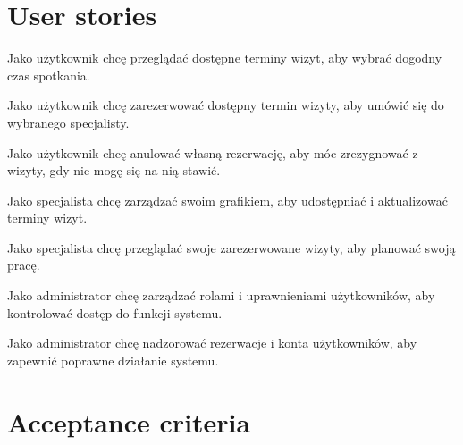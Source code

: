 \documentclass[12pt,a4paper]{article}
\begin{document}
\section{User stories}
\begin{description}[leftmargin=1.8cm, labelwidth=1.3cm, labelsep=0.5cm]
    \item[US1] Jako użytkownik chcę przeglądać dostępne terminy wizyt, aby wybrać dogodny czas spotkania.
    \item[US2] Jako użytkownik chcę zarezerwować dostępny termin wizyty, aby umówić się do wybranego specjalisty.
    \item[US3] Jako użytkownik chcę anulować własną rezerwację, aby móc zrezygnować z wizyty, gdy nie mogę się na nią stawić.
    \item[US4] Jako specjalista chcę zarządzać swoim grafikiem, aby udostępniać i aktualizować terminy wizyt.
    \item[US5] Jako specjalista chcę przeglądać swoje zarezerwowane wizyty, aby planować swoją pracę.
    \item[US6] Jako administrator chcę zarządzać rolami i uprawnieniami użytkowników, aby kontrolować dostęp do funkcji systemu.
    \item[US7] Jako administrator chcę nadzorować rezerwacje i konta użytkowników, aby zapewnić poprawne działanie systemu.
\end{description}

\section{Acceptance criteria}
\end{document}
